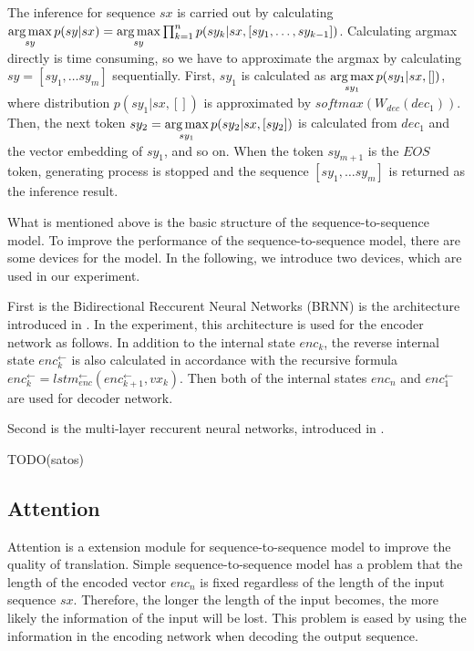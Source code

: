 \documentclass[senior,final,11pt]{iscs-thesis}
\newcommand{\argmax}{\mathop{\rm arg\,max}\limits}
\begin{document}
The inference for sequence $sx$ is carried out by calculating 
$ \argmax_{sy} p(sy|sx) = \argmax_{sy} \prod_{k=1}^n p(sy_k|sx,[sy_1,\dots,sy_{k-1}]) $.
Calculating argmax directly is time consuming, so we have to approximate the argmax by calculating $sy = [sy_1, \dots sy_m]$ sequentially.
First, $sy_1$ is calculated as $ \argmax_{sy_1} p(sy_1|sx,[]) $, where distribution $ p(sy_1|sx,[]) $ is approximated by 
$ softmax(W_{dec}(dec_{1}))$. 
Then, the next token $sy_2 = \argmax_{sy_1} p(sy_2|sx,[sy_2]) $ is calculated from $ dec_{1} $ and the vector embedding of $sy_1$, and so on.
When the token $sy_{m+1}$ is the $ EOS $ token, generating process is stopped and the sequence $ [sy_1, \dots sy_m]$ is returned as the inference result.


What is mentioned above is the basic structure of the sequence-to-sequence model.
To improve the performance of the sequence-to-sequence model, there are some devices for the model.
In the following, we introduce two devices, which are used in our experiment.

First is the Bidirectional Reccurent Neural Networks (BRNN) is the architecture introduced in \cite{BiRNN}.
In the experiment, this architecture is used for the encoder network as follows.
In addition to the internal state $ enc_{k} $, the reverse internal state $ enc_{k}^{\gets} $ is also calculated 
in accordance with the recursive formula $ enc_{k}^{\gets} = lstm_{enc}^{\gets}(enc_{k+1}^{\gets},vx_{k}) $.
Then both of the internal states $ enc_{n} $ and $ enc_{1}^{\gets} $ are used for decoder network.

Second is the multi-layer reccurent neural networks, introduced in \cite{multi_layer}.

TODO(satos)




\subsection{Attention}
Attention is a extension module for sequence-to-sequence model to improve the quality of translation. 
Simple sequence-to-sequence model has a problem that the length of the encoded vector $enc_{n}$ is fixed 
regardless of the length of the input sequence $sx$. 
Therefore, the longer the length of the input becomes, the more likely the information of the input will be lost.
This problem is eased by using the information in the encoding network when decoding the output sequence.
\end{document}
